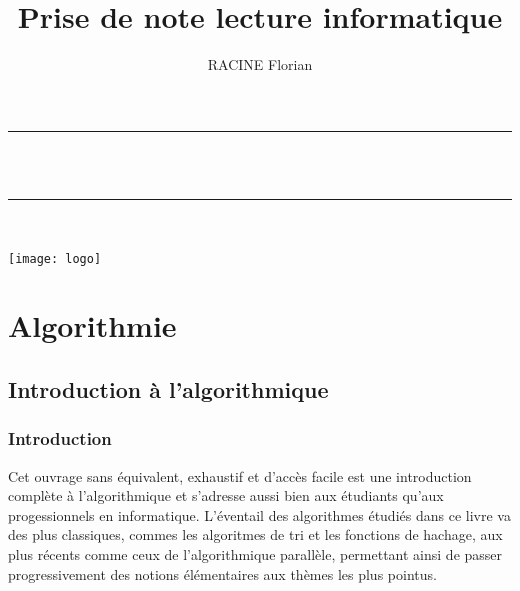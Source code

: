 \documentclass[11pt, a4paper]{article}
\author{RACINE Florian}
\title{Prise de note lecture informatique}
\newcommand{\HRule}{\rule{\linewidth}{0.5mm}}
\begin{document}
\maketitle %
\begin{center}
\HRule \\[0.4cm]
{ \huge \bfseries \thetitle \\[0.4cm] }
\HRule \\[2cm]
\graphicspath{{/home/evo/Pictures/logo/}}
\texttt{[image: logo]}
\end{center}
\newpage

\tableofcontents
\newpage

\graphicspath{{image/}} %

\section{Algorithmie}
\subsection{Introduction à l'algorithmique}
\subsubsection{Introduction}
Cet ouvrage sans équivalent, exhaustif et d'accès facile est une introduction complète à l'algorithmique et s'adresse aussi bien aux étudiants qu'aux progessionnels en informatique.
\newline
L'éventail des algorithmes étudiés dans ce livre va des plus classiques, commes les algoritmes de tri et les fonctions de hachage, aux plus récents comme ceux de l'algorithmique parallèle, permettant ainsi de passer progressivement des notions élémentaires aux thèmes les plus pointus.
\end{document}
